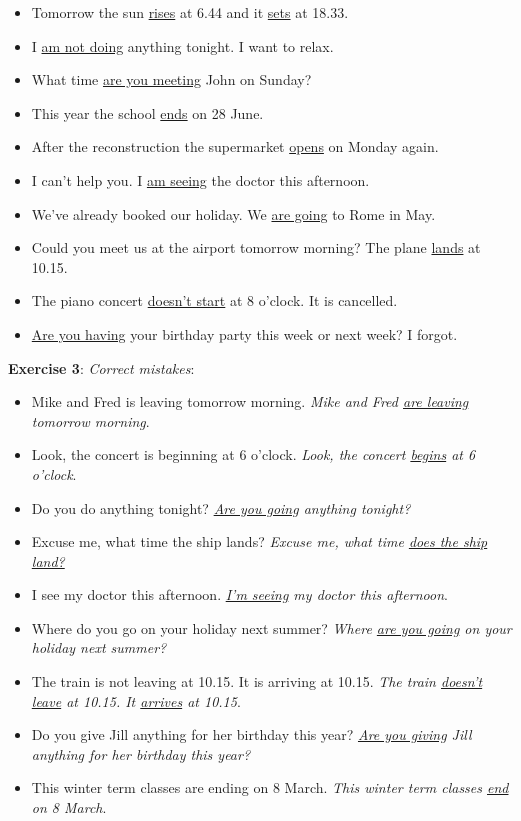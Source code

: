 \begin{itemize}

\item Tomorrow the sun \underline{rises} at 6.44 and it \underline{sets} at 18.33.
\item I \underline{am not doing} anything tonight. I want to relax.
\item What time \underline{are you meeting} John on Sunday?
\item This year the school \underline{ends} on 28 June.
\item After the reconstruction the supermarket \underline{opens} on Monday again.
\item I can't help you. I \underline{am seeing} the doctor this afternoon.
\item We've already booked our holiday. We \underline{are going} to Rome in May.
\item Could you meet us at the airport tomorrow morning? The plane \underline{lands} at 10.15.
\item The piano concert \underline{doesn't start} at 8 o'clock. It is cancelled.
\item \underline{Are you having} your birthday party this week or next week? I forgot.

\end{itemize}

\textbf{Exercise 3}: \textit{Correct mistakes}:

\begin{itemize}

\item Mike and Fred is leaving tomorrow morning. \textit{Mike and Fred \underline{are leaving} tomorrow morning}.
\item Look, the concert is beginning at 6 o'clock. \textit{Look, the concert \underline{begins} at 6 o'clock}.
\item Do you do anything tonight? \textit{\underline{Are you going} anything tonight?}
\item Excuse me, what time the ship lands? \textit{Excuse me, what time \underline{does the ship land?}}
\item I see my doctor this afternoon. \textit{\underline{I'm seeing} my doctor this afternoon}.
\item Where do you go on your holiday next summer? \textit{Where \underline{are you going} on your holiday next summer?}
\item The train is not leaving at 10.15. It is arriving at 10.15. \textit{The train \underline{doesn't leave} at 10.15. It \underline{arrives} at 10.15}.
\item Do you give Jill anything for her birthday this year? \textit{\underline{Are you giving} Jill anything for her birthday this year?}
\item This winter term classes are ending on 8 March. \textit{This winter term classes \underline{end} on 8 March}.

\end{itemize}

